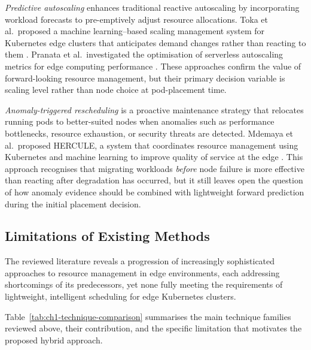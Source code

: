 \textit{Predictive autoscaling} enhances traditional reactive autoscaling by incorporating workload forecasts to pre-emptively adjust resource allocations. Toka et al.\ proposed a machine learning--based scaling management system for Kubernetes edge clusters that anticipates demand changes rather than reacting to them \cite{toka2021scaling}. Pranata et al.\ investigated the optimisation of serverless autoscaling metrics for edge computing performance \cite{pranata2023serverless}. These approaches confirm the value of forward-looking resource management, but their primary decision variable is scaling level rather than node choice at pod-placement time.

\textit{Anomaly-triggered rescheduling} is a proactive maintenance strategy that relocates running pods to better-suited nodes when anomalies such as performance bottlenecks, resource exhaustion, or security threats are detected. Mdemaya et al.\ proposed HERCULE, a system that coordinates resource management using Kubernetes and machine learning to improve quality of service at the edge \cite{mdemaya2020hercule}. This approach recognises that migrating workloads \textit{before} node failure is more effective than reacting after degradation has occurred, but it still leaves open the question of how anomaly evidence should be combined with lightweight forward prediction during the initial placement decision.


\subsection{Limitations of Existing Methods}

The reviewed literature reveals a progression of increasingly sophisticated approaches to resource management in edge environments, each addressing shortcomings of its predecessors, yet none fully meeting the requirements of lightweight, intelligent scheduling for edge Kubernetes clusters.

Table~\ref{tab:ch1-technique-comparison} summarises the main technique families reviewed above, their contribution, and the specific limitation that motivates the proposed hybrid approach.

